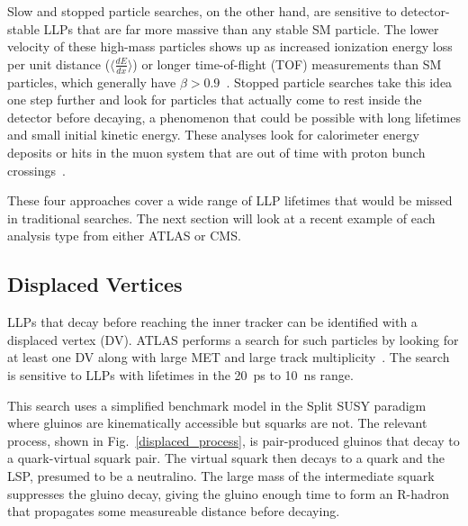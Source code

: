 \documentclass[12pt]{article}
\begin{document}
        Slow and stopped particle searches, on the other hand, are sensitive to detector-stable LLPs that are far more massive than any stable SM particle. The lower velocity of these high-mass particles shows up as increased ionization energy loss per unit distance ($\langle\frac{dE}{dx}\rangle$) or longer time-of-flight (TOF) measurements than SM particles, which generally have $\beta > \num{0.9}$~\cite{cms_hscp}. Stopped particle searches take this idea one step further and look for particles that actually come to rest inside the detector before decaying, a phenomenon that could be possible with long lifetimes and small initial kinetic energy. These analyses look for calorimeter energy deposits or hits in the muon system that are out of time with proton bunch crossings~\cite{cms_stopped}.

        These four approaches cover a wide range of LLP lifetimes that would be missed in traditional searches. The next section will look  at a recent example of each analysis type from either ATLAS or CMS.

    \subsection{Displaced Vertices}
        LLPs that decay before reaching the inner tracker can be identified with a displaced vertex (DV). ATLAS performs a search for such particles by looking for at least one DV along with large MET and large track multiplicity~\cite{atlas_displaced}. The search is sensitive to LLPs with lifetimes in the \SI{20}{\pico\s} to \SI{10}{\nano\s} range.

        This search uses a simplified benchmark model in the Split SUSY paradigm where gluinos are kinematically accessible but squarks are not. The relevant process, shown in Fig.~\ref{displaced_process}, is pair-produced gluinos that decay to a quark-virtual squark pair. The virtual squark then decays to a quark and the LSP, presumed to be a neutralino. The large mass of the intermediate squark suppresses the gluino decay, giving the gluino enough time to form an R-hadron that propagates some measureable distance before decaying. 
\end{document}
